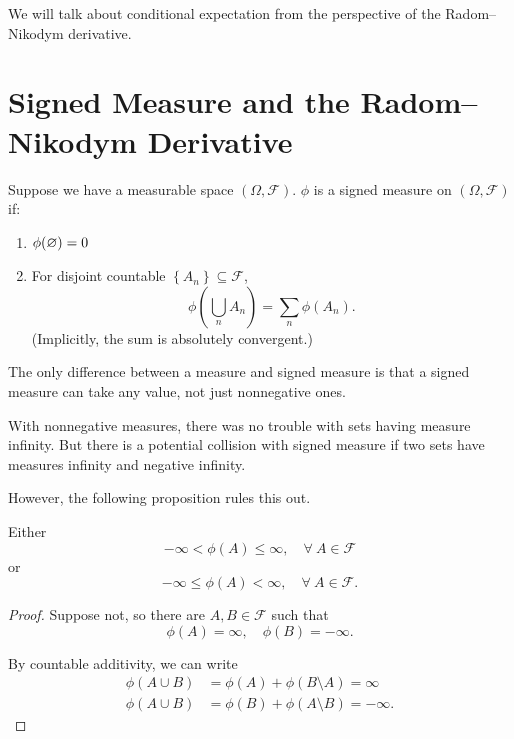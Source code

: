 
We will talk about conditional expectation from the perspective of the Radom--Nikodym derivative.

\section{Signed Measure and the Radom--Nikodym Derivative}

\begin{definition}
	Suppose we have a measurable space $(\Omega, \mathscr{F})$. $\phi$ is a signed measure on $\left( \Omega, \mathscr{F} \right)$ if:
	\begin{enumerate}[label=(\roman*)]
		\item $\phi(\varnothing) = 0$
		\item For disjoint countable $\left\{A_n\right\} \subseteq \mathscr{F}$, \[
			\phi\left( \bigcup\limits_{n}^{} A_n \right) = \sum\limits_{n}^{} \phi(A_n)
		.\] (Implicitly, the sum is absolutely convergent.)
	\end{enumerate}

	The only difference between a measure and signed measure is that a signed measure can take any value, not just nonnegative ones.
\end{definition}

With nonnegative measures, there was no trouble with sets having measure infinity. But there is a potential collision with signed measure if two sets have measures infinity and negative infinity.

However, the following proposition rules this out.
\begin{proposition}
	Either \[
		-\infty < \phi(A) \le \infty, \quad \forall\ A \in \mathscr{F}
	\] or \[
		-\infty \le \phi(A) < \infty, \quad \forall\ A \in \mathscr{F}
	.\] 
\end{proposition}

\begin{proof}
	Suppose not, so there are $A,B \in \mathscr{F}$ such that \[
		\phi(A) = \infty,\quad \phi(B) = -\infty
	.\] 

	 By countable additivity, we can write 
	 \begin{align*}
	 	\phi(A \cup B) &= \phi(A) + \phi(B\setminus A) = \infty \\
		\phi(A \cup B) &= \phi(B) + \phi(A\setminus B) = -\infty
	 .\end{align*}
\end{proof}

